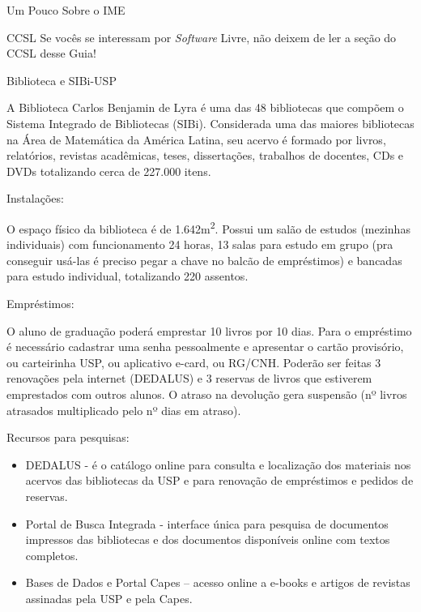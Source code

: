 \begin{secao}{Um Pouco Sobre o IME}
\begin{subsecao}{CCSL}
Se vocês se interessam por \textit{Software} Livre, não deixem de ler a seção
do CCSL desse Guia!

\end{subsecao}

\begin{subsecao}{Biblioteca e SIBi-USP}

A Biblioteca Carlos Benjamin de Lyra é uma das 48 bibliotecas que compõem o Sistema Integrado de Bibliotecas (SIBi). Considerada uma das maiores bibliotecas na Área de Matemática da América Latina, seu acervo é formado por livros, relatórios, revistas acadêmicas, teses, dissertações, trabalhos de docentes, CDs e DVDs totalizando cerca de 227.000 itens. 

\begin{subsubsecao}{Instalações:}

O espaço físico da biblioteca é de 1.642m\textsuperscript{2}. Possui um salão de estudos (mezinhas individuais) com funcionamento 24 horas, 13 salas para estudo em grupo (pra conseguir usá-las é preciso pegar a chave no balcão de empréstimos) e bancadas para estudo individual, totalizando 220 assentos.
\end{subsubsecao}

\begin{subsubsecao}{Empréstimos:}

O aluno de graduação poderá emprestar 10 livros por 10 dias. Para o empréstimo é necessário cadastrar uma senha pessoalmente e apresentar o cartão provisório, ou carteirinha USP, ou aplicativo e-card, ou RG/CNH. Poderão ser feitas 3 renovações pela internet (DEDALUS) e 3 reservas de livros que estiverem emprestados com outros alunos. O atraso na devolução gera suspensão (nº livros atrasados multiplicado pelo nº dias em atraso). 
\end{subsubsecao}

\begin{subsubsecao}{Recursos para pesquisas:}
\begin{itemize}
    \item DEDALUS - é o catálogo online para consulta e localização dos materiais nos acervos das bibliotecas da USP e para renovação de empréstimos e pedidos de reservas. 
    \item Portal de Busca Integrada - interface única para pesquisa de documentos impressos das bibliotecas e dos documentos disponíveis online com textos completos. 
    \item Bases de Dados e Portal Capes – acesso online a e-books e artigos de revistas assinadas pela USP e pela Capes.
    \end{itemize}
\end{subsubsecao}


\end{subsecao}
\end{secao}
